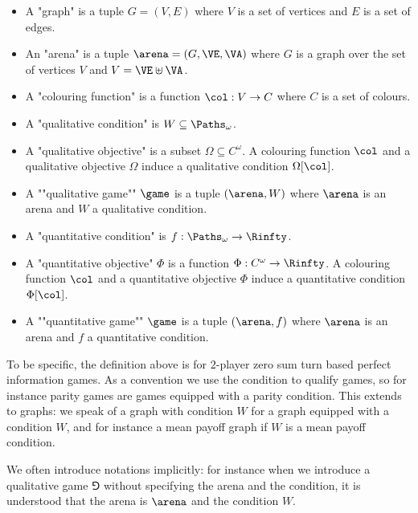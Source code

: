 \begin{definition}[""Games""]
\begin{itemize}
	\item A "graph" is a tuple $G = (V,E)$ where $V$ is a set of vertices
	and $E$ is a set of edges.
	
	\item An "arena" is a tuple $\arena = (G,\VE,\VA)$ where $G$ is a graph over the set of vertices $V$ and $V = \VE \uplus \VA$.

	\item A "colouring function" is a function $\col : V \to C$ where $C$ is a set of colours.

	\item A "qualitative condition" is $W \subseteq \Paths_\omega$.
	
	\item A "qualitative objective" is a subset $\Omega \subseteq C^\omega$.
	A colouring function $\col$ and a qualitative objective $\Omega$ induce 
	a qualitative condition $\Omega[\col]$.

	\item A ""qualitative game"" $\game$ is a tuple $(\arena,W)$ where $\arena$ is an arena and $W$ a qualitative condition.

	\item A "quantitative condition" is $f : \Paths_\omega \to \Rinfty$.

	\item A "quantitative objective" $\Phi$ is a function $\Phi : C^\omega \to \Rinfty$.
	A colouring function $\col$ and a quantitative objective $\Phi$ induce 
	a quantitative condition $\Phi[\col]$.
	
	\item A ""quantitative game"" $\game$ is a tuple $(\arena,f)$ where $\arena$ is an arena and $f$ a quantitative condition.	
\end{itemize}
\end{definition}
To be specific, the definition above is for $2$-player zero sum turn based perfect information games.
As a convention we use the condition to qualify games, so for instance parity games are games equipped with a parity condition.
This extends to graphs: we speak of a graph with condition $W$ for a graph equipped with a condition $W$,
and for instance a mean payoff graph if $W$ is a mean payoff condition.

We often introduce notations implicitly: for instance when we introduce a qualitative game $\Game$ without specifying the arena and the condition, it is understood that the arena is $\arena$ and the condition $W$.

